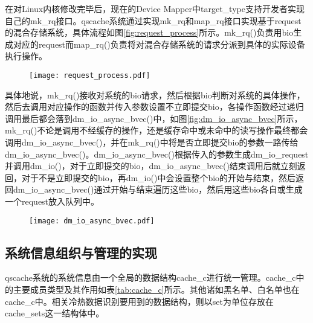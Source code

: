 在对Linux内核修改完毕后，现在的Device Mapper中target\_type支持开发者实现自己的mk\_rq接口。qscache系统通过实现mk\_rq和map\_rq接口实现基于request的混合存储系统，具体流程如图\ref{fig:request_process}所示。mk\_rq()负责用bio生成对应的request而map\_rq()负责将对混合存储系统的请求分派到具体的实际设备执行操作。

\begin{figure}[!htbp]
    \centering
    \texttt{[image: request\_process.pdf]}

    \vskip -1cm

\end{figure}

具体地说，mk\_rq()接收对系统的bio请求，然后根据bio判断对系统的具体操作，然后去调用对应操作的函数并传入参数设置不立即提交bio，各操作函数经过递归调用最后都会落到dm\_io\_async\_bvec()中，如图\ref{fig:dm_io_async_bvec}所示，mk\_rq()不论是调用不经缓存的操作，还是缓存命中或未命中的读写操作最终都会调用dm\_io\_async\_bvec()，并在mk\_rq()中将是否立即提交bio的参数一路传给dm\_io\_async\_bvec()。dm\_io\_async\_bvec()根据传入的参数生成dm\_io\_request并调用dm\_io()，对于立即提交的bio，dm\_io\_async\_bvec()结束调用后就立刻返回，对于不是立即提交的bio，再dm\_io()中会设置整个bio的开始与结束，然后返回dm\_io\_async\_bvec()通过开始与结束遍历这些bio，然后用这些bio各自或生成一个request放入队列中。

\begin{figure}[!htbp]
    \centering
    \texttt{[image: dm\_io\_async\_bvec.pdf]}
\end{figure}


\subsection{系统信息组织与管理的实现}

qscache系统的系统信息由一个全局的数据结构cache\_c进行统一管理。cache\_c中的主要成员类型及其作用如表\ref{tab:cache_c}所示。其他诸如黑名单、白名单也在cache\_c中。相关冷热数据识别要用到的数据结构，则以set为单位存放在cache\_sets这一结构体中。

